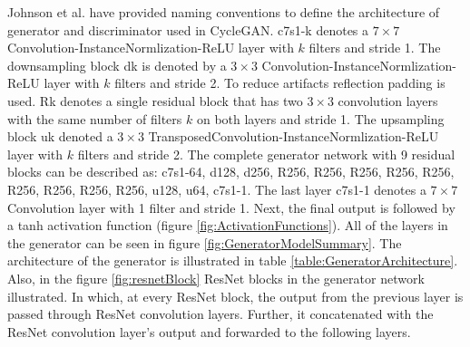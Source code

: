 Johnson et al. \cite{johnson2016perceptual} have provided naming conventions to define the architecture of generator and discriminator used in \ac{CycleGAN}. {\selectfont c7s1-k} denotes a $7 \times 7$ Convolution-InstanceNormlization-ReLU layer with $k$ filters and stride 1. The downsampling block {\selectfont dk} is denoted by a $3 \times 3$ Convolution-InstanceNormlization-ReLU layer with $k$ filters and stride 2. To reduce artifacts reflection padding is used. {\selectfont Rk} denotes a single residual block that has two $3 \times 3$ convolution layers with the same number of filters $k$ on both layers and stride 1. The upsampling block {\selectfont uk} denoted a $3 \times 3$ TransposedConvolution-InstanceNormlization-ReLU layer with $k$ filters and stride 2. The complete generator network with 9 residual blocks can be described as: {\selectfont c7s1-64, d128, d256, R256, R256, R256, R256, R256, R256, R256, R256, R256, u128, u64, c7s1-1}. The last layer {\selectfont c7s1-1} denotes a $7 \times 7$ Convolution layer with 1 filter and stride 1. Next, the final output is followed by a tanh activation function (figure \ref{fig:ActivationFunctions}). All of the layers in the generator can be seen in figure \ref{fig:GeneratorModelSummary}. The architecture of the generator is illustrated in table \ref{table:GeneratorArchitecture}. Also, in the figure \ref{fig:resnetBlock} \ac{ResNet} blocks in the generator network illustrated. In which, at every \ac{ResNet} block, the output from the previous layer is passed through \ac{ResNet} convolution layers. Further, it concatenated with the \ac{ResNet} convolution layer's output and forwarded to the following layers.






